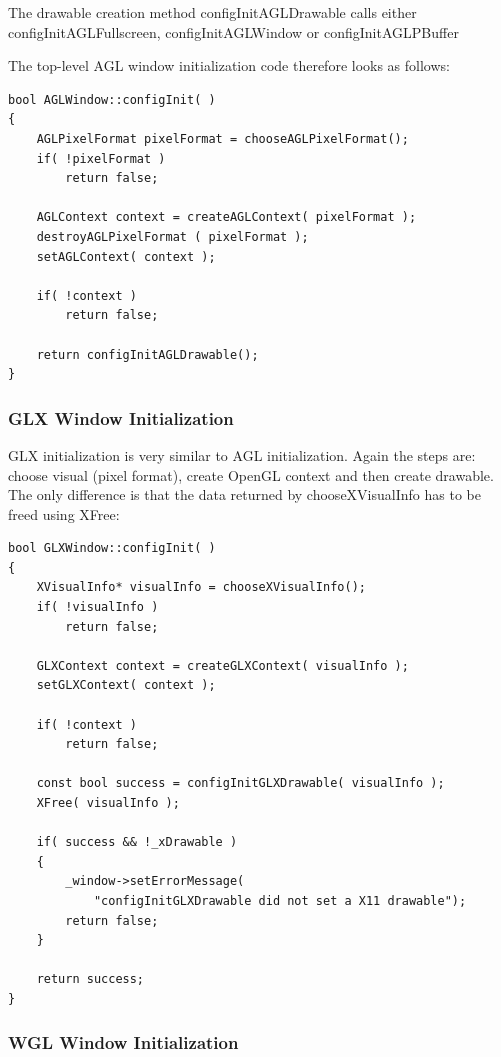 \documentclass[10pt,a4]{scrartcl}
\begin{document}
The drawable creation method \textsf{configInitAGLDrawable} calls either
\textsf{configInitAGLFullscreen}, \textsf{configInitAGLWindow} or \textsf{configInitAGLPBuffer}

The top-level AGL window initialization code therefore looks as follows:

{\footnotesize\begin{lstlisting}
bool AGLWindow::configInit( )
{
    AGLPixelFormat pixelFormat = chooseAGLPixelFormat();
    if( !pixelFormat )
        return false;

    AGLContext context = createAGLContext( pixelFormat );
    destroyAGLPixelFormat ( pixelFormat );
    setAGLContext( context );

    if( !context )
        return false;

    return configInitAGLDrawable();
}
\end{lstlisting}}


\subsubsection{GLX Window Initialization}

GLX initialization is very similar to AGL initialization. Again the
steps are: choose visual (pixel format), create OpenGL context and then
create drawable. The only difference is that the data returned by
\textsf{chooseXVisualInfo} has to be freed using \textsf{XFree}:

{\footnotesize\begin{lstlisting}
bool GLXWindow::configInit( )
{
    XVisualInfo* visualInfo = chooseXVisualInfo();
    if( !visualInfo )
        return false;

    GLXContext context = createGLXContext( visualInfo );
    setGLXContext( context );

    if( !context )
        return false;

    const bool success = configInitGLXDrawable( visualInfo );
    XFree( visualInfo );

    if( success && !_xDrawable )
    {
        _window->setErrorMessage( 
            "configInitGLXDrawable did not set a X11 drawable");
        return false;
    }

    return success;    
}
\end{lstlisting}}


\subsubsection{WGL Window Initialization}
\end{document}
